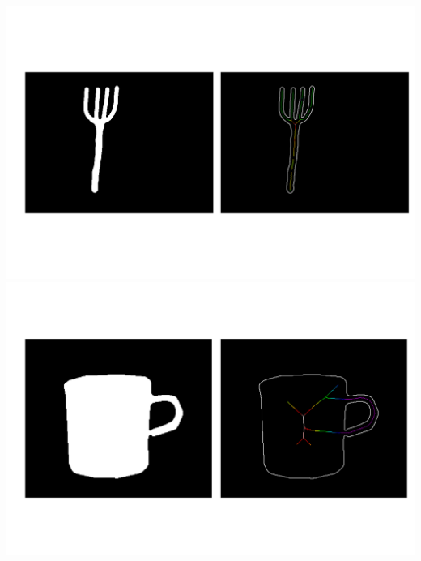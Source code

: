 \documentclass[12pt]{article}
\begin{document}
\includegraphics[scale=0.25]{fork_75.png}
\includegraphics[scale=0.25]{cup_476.png}

\vspace{12px}
\end{document}
